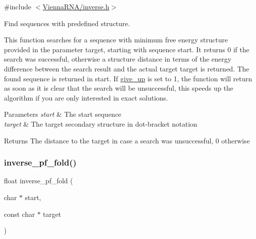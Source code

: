 {\ttfamily \#include $<$\hyperlink{inverse_8h}{Vienna\+R\+N\+A/inverse.\+h}$>$}



Find sequences with predefined structure. 

This function searches for a sequence with minimum free energy structure provided in the parameter \textquotesingle{}target\textquotesingle{}, starting with sequence \textquotesingle{}start\textquotesingle{}. It returns 0 if the search was successful, otherwise a structure distance in terms of the energy difference between the search result and the actual target \textquotesingle{}target\textquotesingle{} is returned. The found sequence is returned in \textquotesingle{}start\textquotesingle{}. If \hyperlink{group__inverse__fold_ga7ec4ba51f86e1717a1e174264e4a75ce}{give\+\_\+up} is set to 1, the function will return as soon as it is clear that the search will be unsuccessful, this speeds up the algorithm if you are only interested in exact solutions.


\begin{DoxyParams}{Parameters}
{\em start} & The start sequence \\
\hline
{\em target} & The target secondary structure in dot-\/bracket notation \\
\hline
\end{DoxyParams}
\begin{DoxyReturn}{Returns}
The distance to the target in case a search was unsuccessful, 0 otherwise 
\end{DoxyReturn}
\mbox{\label{group__inverse__fold_gaeef52ecbf2a2450ad585a344f9826806}} 
\subsubsection{\texorpdfstring{inverse\+\_\+pf\+\_\+fold()}{inverse\_pf\_fold()}}
{\footnotesize\ttfamily float inverse\+\_\+pf\+\_\+fold (\begin{DoxyParamCaption}\item[{char $\ast$}]{start,  }\item[{const char $\ast$}]{target }\end{DoxyParamCaption})}



